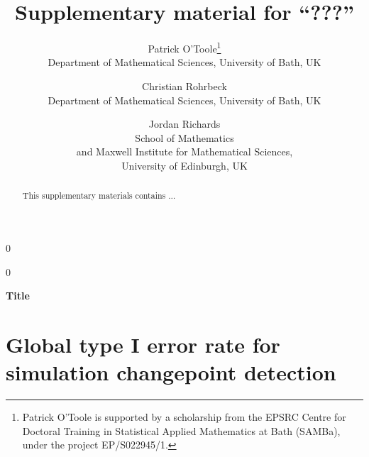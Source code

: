 \documentclass[12pt,compact]{article}
\newcommand{\blind}{0}
\begin{document}
\def\spacingset#1{\renewcommand{\baselinestretch}%
{#1}\small\normalsize} \spacingset{1}


\blind
{
  \title{\bf Supplementary material for ``???''}
  \author{
  Patrick O'Toole\thanks{Patrick O'Toole is supported by a scholarship from the EPSRC Centre for Doctoral Training in Statistical Applied Mathematics at Bath (SAMBa), under the project EP/S022945/1.}\\
  Department of Mathematical Sciences, University of Bath, UK
  \and
  Christian Rohrbeck\\
  Department of Mathematical Sciences, University of Bath, UK 
  \and
  Jordan Richards\\
  School of Mathematics \\
  and Maxwell Institute for Mathematical Sciences, \\
  University of Edinburgh, UK
  }
  \maketitle
} \fi

\blind
{
  \bigskip
  \begin{center}
    {\LARGE\bf Title}
\end{center}
  \medskip
} \fi

\begin{abstract}
  This supplementary materials contains $\ldots$
\end{abstract}

\newpage
\spacingset{1.75} %

\setlength{\textfloatsep}{10pt plus 1pt minus 2pt}
\setlength{\intextsep}{8pt plus 1pt minus 2pt}
\setlength{\floatsep}{8pt plus 1pt minus 2pt}

\setlength{\abovedisplayskip}{8pt plus 2pt minus 4pt}
\setlength{\belowdisplayskip}{8pt plus 2pt minus 4pt}
\setlength{\abovedisplayshortskip}{4pt plus 2pt minus 4pt}
\setlength{\belowdisplayshortskip}{4pt plus 2pt minus 4pt}

\section{Global type I error rate for simulation changepoint detection}
\end{document}
